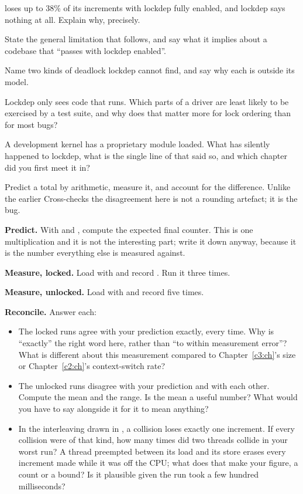   loses up to 38\% of its increments with lockdep fully enabled, and lockdep
says nothing at all. Explain why, precisely.

 State the general limitation that follows, and say what it implies about a codebase that
``passes with lockdep enabled''.

 Name two kinds of deadlock lockdep cannot find, and say why each is outside its model.

 Lockdep only sees code that runs. Which parts of a driver are least likely to be exercised
by a test suite, and why does that matter more for lock ordering than for most bugs?

 A development kernel has a proprietary module loaded. What has silently happened to
lockdep, what is the single line of  that said so, and which chapter did you first meet
it in?

\label{c7:ex:9}

Predict a total by arithmetic, measure it, and account for the difference. Unlike the earlier
Cross-checks the disagreement here is not a rounding artefact; it is the bug.

 \textbf{Predict.} With  and , compute the expected
final counter. This is one multiplication and it is not the interesting part; write it down anyway,
because it is the number everything else is measured against.

 \textbf{Measure, locked.} Load with  and record . Run it three
times.

 \textbf{Measure, unlocked.} Load with  and record  five times.

 \textbf{Reconcile.} Answer each:
\begin{itemize}
  \item The locked runs agree with your prediction exactly, every time. Why is ``exactly'' the right
    word here, rather than ``to within measurement error''? What is different about this measurement
    compared to Chapter~\ref{c3:ch}'s  size or Chapter~\ref{c2:ch}'s context-switch
    rate?
  \item The unlocked runs disagree with your prediction and with each other. Compute the mean and
    the range. Is the mean a useful number? What would you have to say alongside it for it to mean
    anything?
  \item In the interleaving drawn in , a collision loses exactly one increment. If
    every collision were of that kind, how many times did two threads collide in your worst run? A
    thread preempted between its load and its store erases every increment made while it was off
    the CPU; what does that make your figure, a count or a bound? Is it plausible given the run took
    a few hundred milliseconds?
\end{itemize}

